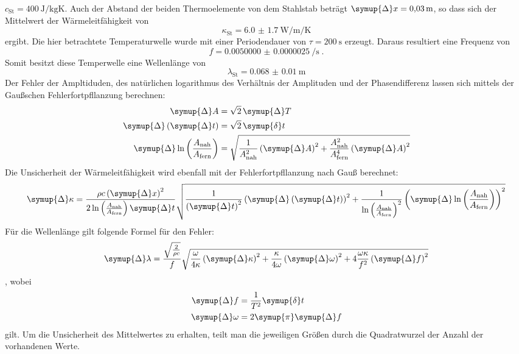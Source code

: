 $c_\text{St} = \SI{400}{\joule\per\kilogram\kelvin}$. Auch der Abstand der beiden Thermoelemente von dem Stahlstab
beträgt $\symup{\Delta} x = \SI{0.03}{\metre}$, so dass sich der Mittelwert der Wärmeleitfähigkeit von
\begin{equation}
  \kappa_\text{St} = \SI{6.0(17)}{\watt\per\metre\per\kelvin}
\end{equation}
ergibt. Die hier betrachtete Temperaturwelle wurde mit einer Periodendauer von $\tau = \SI{200}{\second}$ erzeugt.
Daraus resultiert eine Frequenz von 
\begin{equation}
  f = \SI{0.0050000(25)}{\per\second} \; \text{.}
\end{equation}
Somit besitzt diese Temperwelle eine Wellenlänge von 
\begin{equation}
  \lambda_\text{St} = \SI{0.068(10)}{\metre}
\end{equation}
Der Fehler der Ampltiduden, des natürlichen logarithmus des Verhältnis der Amplituden und der Phasendifferenz 
lassen sich mittels der Gaußschen Fehlerfortpfllanzung berechnen:
\begin{align}
  \symup{\Delta} A                                                      &= \sqrt{2} \, \symup{\Delta} T \\
  \symup{\Delta} \left (\symup{\Delta} t \right )                       &= \sqrt{2} \, \symup{\delta} t \\
  \symup{\Delta} \ln \left ( \frac{A_\text{nah}}{A_\text{fern}} \right) &= 
  \sqrt{\frac{1}{A_\text{nah}^2} \left ( \symup{\Delta} A \right )^2 + 
  \frac{A_\text{nah}^2}{A_\text{fern}^4} \left ( \symup{\Delta} A \right ) ^2} 
\end{align}
Die Unsicherheit der Wärmeleitfähigkeit wird ebenfall mit der Fehlerfortpfllanzung nach Gauß berechnet:
\begin{equation} 
  \symup{\Delta} \kappa = \frac{\rho c \left ( \symup{\Delta} x \right )^2 }
  {2\ln \left ( \frac{A_\text{nah}}{A_\text{fern}} \right ) \symup{\Delta} t} 
  \sqrt{\frac{1}{\left( \symup{\Delta} t\right)^2}
  \left ( \symup{\Delta} \left ( \symup{\Delta} t \right ) \right )^2 + \frac{1}{ \ln \left ( \frac{A_\text{nah}}{A_\text{fern}} \right )^2}
 \left (  \symup{\Delta} \ln \left ( \frac{A_\text{nah}}{A_\text{fern}} \right ) \right )^2}
\end{equation}
Für die Wellenlänge gilt folgende Formel für den Fehler: 
\begin{equation}
 \symup{\Delta} \lambda =  \frac{\sqrt{\frac{2}{\rho c}}} {f} \sqrt{ \frac{\omega}{4 \kappa} \left ( \symup{\Delta} \kappa \right )^2 +
  \frac{\kappa}{4 \omega} \left( \symup{\Delta}\omega\right)^2 +
   4 \frac{\omega\kappa}{f^2} \left(\symup{\Delta} f\right)^2   }
\end{equation}
, wobei
\begin{align}
    \symup{\Delta}f &= \frac{1}{T^2} \symup{\delta} t \\
    \symup{\Delta}\omega &= 2 \symup{\pi} \symup{\Delta} f
\end{align}
gilt. Um die Unsicherheit des Mittelwertes zu erhalten, teilt man die jeweiligen Größen durch die Quadratwurzel der Anzahl der vorhandenen Werte.